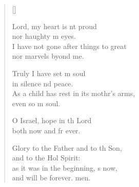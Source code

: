 \settowidth{\versewidth}{As a child has rest in its mother’s arms, *}
\begin{verse}[\versewidth]
  \begin{patverse}
 Lord, my heart is nt proud\Med\\
nor haughty m eyes.\\
I have not gone after things to great\Med\\
nor marvels byond me.

Truly I have set m soul\Med\\
in silence nd peace.\\
As a child has rest in its mothr’s arms,\Med\\
even so m soul.

O Israel, hope in th Lord\Med\\
both now and fr ever.

Glory to the Father and to th Son,\Med\\
and to the Hol Spirit:\\
as it was in the beginning, \pointup{\i}s now,\Med\\
and will be forever. men.
  \end{patverse}
\end{verse}
